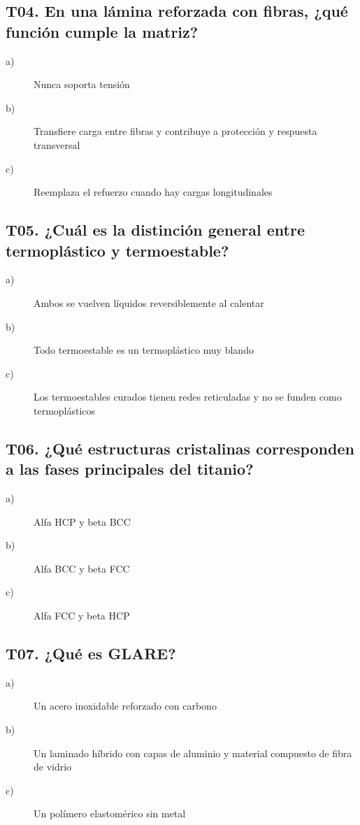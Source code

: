 \subsection*{T04. En una lámina reforzada con fibras, ¿qué función cumple la matriz?}
\begin{description}
\item[a)] Nunca soporta tensión
\item[b)] Transfiere carga entre fibras y contribuye a protección y respuesta transversal
\item[c)] Reemplaza el refuerzo cuando hay cargas longitudinales
\end{description}

\subsection*{T05. ¿Cuál es la distinción general entre termoplástico y termoestable?}
\begin{description}
\item[a)] Ambos se vuelven líquidos reversiblemente al calentar
\item[b)] Todo termoestable es un termoplástico muy blando
\item[c)] Los termoestables curados tienen redes reticuladas y no se funden como termoplásticos
\end{description}

\subsection*{T06. ¿Qué estructuras cristalinas corresponden a las fases principales del titanio?}
\begin{description}
\item[a)] Alfa HCP y beta BCC
\item[b)] Alfa BCC y beta FCC
\item[c)] Alfa FCC y beta HCP
\end{description}

\subsection*{T07. ¿Qué es GLARE?}
\begin{description}
\item[a)] Un acero inoxidable reforzado con carbono
\item[b)] Un laminado híbrido con capas de aluminio y material compuesto de fibra de vidrio
\item[c)] Un polímero elastomérico sin metal
\end{description}

